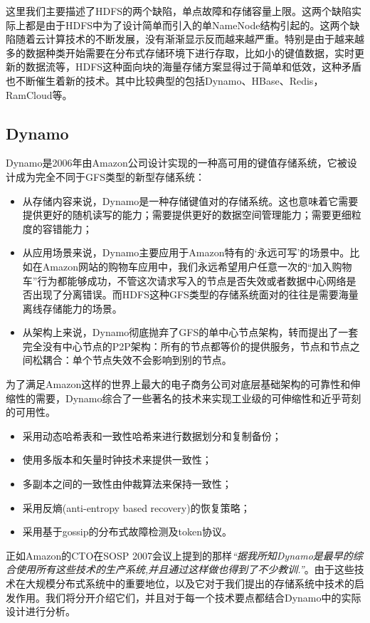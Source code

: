 这里我们主要描述了HDFS的两个缺陷，单点故障和存储容量上限。这两个缺陷实际上都是由于HDFS中为了设计简单而引入的单NameNode结构引起的。这两个缺陷随着云计算技术的不断发展，没有渐渐显示反而越来越严重。特别是由于越来越多的数据种类开始需要在分布式存储环境下进行存取，比如小的键值数据，实时更新的数据流等，HDFS这种面向块的海量存储方案显得过于简单和低效，这种矛盾也不断催生着新的技术。其中比较典型的包括Dynamo、HBase、Redis，RamCloud等。

\subsection{Dynamo}

Dynamo是2006年由Amazon公司设计实现的一种高可用的键值存储系统，它被设计成为完全不同于GFS类型的新型存储系统：
\begin{itemize}
\item 从存储内容来说，Dynamo是一种存储键值对的存储系统。这也意味着它需要提供更好的随机读写的能力；需要提供更好的数据空间管理能力；需要更细粒度的容错能力；
\item 从应用场景来说，Dynamo主要应用于Amazon特有的‘永远可写’的场景中。比如在Amazon网站的购物车应用中，我们永远希望用户任意一次的“加入购物车”行为都能够成功，不管这次请求写入的节点是否失效或者数据中心网络是否出现了分离错误。而HDFS这种GFS类型的存储系统面对的往往是需要海量离线存储能力的场景。
\item 从架构上来说，Dynamo彻底抛弃了GFS的单中心节点架构，转而提出了一套完全没有中心节点的P2P架构：所有的节点都等价的提供服务，节点和节点之间松耦合：单个节点失效不会影响到别的节点。
\end{itemize}

为了满足Amazon这样的世界上最大的电子商务公司对底层基础架构的可靠性和伸缩性的需要，Dynamo综合了一些著名的技术来实现工业级的可伸缩性和近乎苛刻的可用性。
\begin{itemize}
\item 采用动态哈希表和一致性哈希来进行数据划分和复制备份；
\item 使用多版本和矢量时钟技术来提供一致性；
\item 多副本之间的一致性由仲裁算法来保持一致性；
\item 采用反熵(anti-entropy based recovery)的恢复策略；
\item 采用基于gossip的分布式故障检测及token协议。
\end{itemize}
正如Amazon的CTO在SOSP 2007会议上提到的那样\textit{“据我所知Dynamo是最早的综合使用所有这些技术的生产系统,并且通过这样做也得到了不少教训.”}。由于这些技术在大规模分布式系统中的重要地位，以及它对于我们提出的存储系统中技术的启发作用。我们将分开介绍它们，并且对于每一个技术要点都结合Dynamo中的实际设计进行分析。


